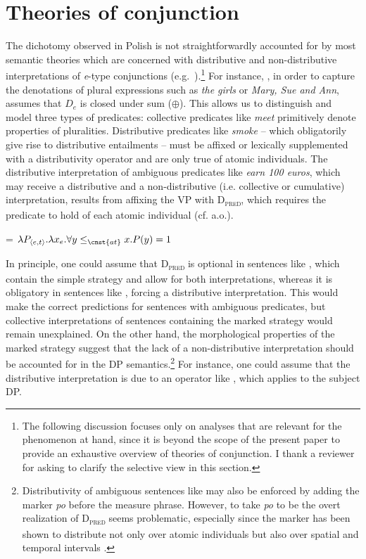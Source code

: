 \documentclass[output=paper]{langscibook}
\begin{document}
\section{Theories of conjunction}\label{ros:sec:2}

The dichotomy observed in Polish is not straightforwardly accounted for by most semantic theories which are concerned with distributive and non-distributive interpretations of \textit{e}-type conjunctions (e.g.~\citealt{Link:1983, Partee:1983, Landman:1989, Krifka:1990, Schein:1993, Schein:2017, Schwarzschild:1996}).\footnote{The following discussion focuses only on analyses that are relevant for the phenomenon at hand, since it is beyond the scope of the present paper to provide an exhaustive overview of theories of conjunction. I thank a reviewer for asking to clarify the selective view in this section.} For instance, \citet{Link:1983}, in order to capture the denotations of plural expressions such as \textit{the girls} or \textit{Mary, Sue and Ann}, assumes that $D_{e}$ is closed under sum ($\oplus$). This allows us to distinguish and model three types of predicates: collective predicates like \textit{meet} primitively denote properties of pluralities. Distributive predicates like \textit{smoke} -- which obligatorily give rise to distributive entailments -- must be affixed or lexically supplemented with a distributivity operator and are only true of atomic individuals. The distributive interpretation of ambiguous predicates like \textit{earn 100 euros}, which may receive a distributive and a non-distributive (i.e. collective or cumulative) interpretation, results from affixing the VP with \textsc{D\textsubscript{pred}}, which requires the predicate to hold of each atomic individual (cf. \citealt{Link:1987} a.o.).

\ea\label{ros:d1}
 = $\lambda P_{\langle e,t \rangle}. \lambda x_{e}. \forall y \le_{\cnst{at}} x.P(y) = 1$ 
\z

\noindent In principle, one could assume that \textsc{D\textsubscript{pred}} is optional in sentences like , which contain the simple strategy and allow for both interpretations, whereas it is obligatory in sentences like , forcing a distributive interpretation. This would make the correct predictions for sentences with ambiguous predicates, but collective interpretations of sentences containing the marked strategy would remain unexplained. On the other hand, the morphological properties of the marked strategy suggest that the lack of a non-distributive interpretation should be accounted for in the DP semantics.\footnote{Distributivity of ambiguous sentences like  may also be enforced by adding the marker \textit{po} before the measure phrase. However, to take \textit{po} to be the overt realization of \textsc{D\textsubscript{pred}} seems problematic, especially since the marker has been shown to distribute not only over atomic individuals but also over spatial and temporal intervals \citep{Przepiorkowski:2014, Champollion:2016}.} For instance, one could assume that the distributive interpretation is due to an operator like , which applies to the subject DP.
\end{document}
